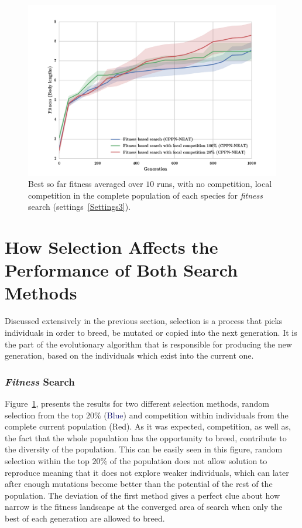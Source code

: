 \begin{figure}[b!]
\centering
\includegraphics[width=1.0\textwidth]{../Figures/Results/fitComp100_20percent.pdf}
\caption{Best so far fitness averaged over $10$ runs, with no competition, local competition in the complete population of each species for \emph{fitness} search (settings~\ref{Settings3}).}
\label{fig:fitComp100_20percent}
\end{figure}

\section{How Selection Affects the Performance of Both Search Methods}

Discussed extensively in the previous section, selection is a process that picks individuals in order to breed, be mutated or copied into the next generation. It is the part of the evolutionary algorithm that is responsible for producing the new generation, based on the individuals which exist into the current one.


\subsubsection*{\emph{Fitness} Search}

Figure~\ref{fig:fitComp100_20percent}, presents the results for two different selection methods, random selection from the top $20\%$ (\textcolor{MidnightBlue}{Blue}) and competition within individuals from the complete current population (\textcolor{BrickRed}{Red}). As it was expected, competition, as well as, the fact that the whole population has the opportunity to breed, contribute to the diversity of the population. This can be easily seen in this figure, random selection within the top $20\%$ of the population does not allow solution to reproduce meaning that it does not explore weaker individuals, which can later after enough mutations become better than the potential of the rest of the population. The deviation of the first method gives a perfect clue about how narrow is the fitness landscape at the converged area of search when only the best of each generation are allowed to breed.


